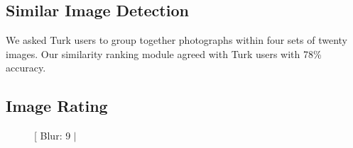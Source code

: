 \documentclass{article}
\begin{document}
\subsection{Similar Image Detection}
We asked Turk users to group together photographs within four sets of twenty images. Our similarity ranking module agreed with Turk users with 78\% accuracy.

\subsection{Image Rating}
\begin{figure}[t]
\centering
{}
\subfloat[
Blur: 9 \(\mid\)

\end{figure}
\end{document}
